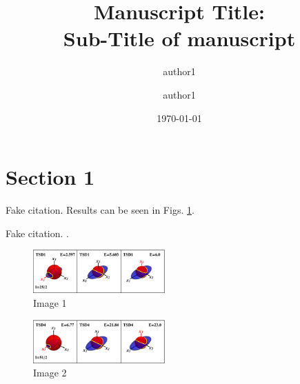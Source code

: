 \documentclass[%
 reprint,
 amsmath,
 amssymb,
 aps,
]{revtex4-2}
\begin{document}
\title{Manuscript Title:\\Sub-Title of manuscript }%

\author{author1}%
\author{author1}%
%


\date{\today}

\begin{abstract}
\lipsum[1]
\end{abstract}

\maketitle


\section{Section 1}

\lipsum[1-2] Fake citation. Results can be seen in Figs. \ref{fig:image-1}.

\lipsum[1] Fake citation. \cite{chakraborty2020multiphonon}.

\begin{figure}
    \centering
    \includegraphics[width=0.45\textwidth]{images/energy_ellipsoids/tsd1_spin1.eps}
    \caption{Image 1}
    \label{fig:image-1}
\end{figure}


\begin{figure}
    \centering
    \includegraphics[width=0.45\textwidth]{images/energy_ellipsoids/tsd4_spin2.eps}
    \caption{Image 2}
    \label{fig:image-2}
\end{figure}


\end{document}
